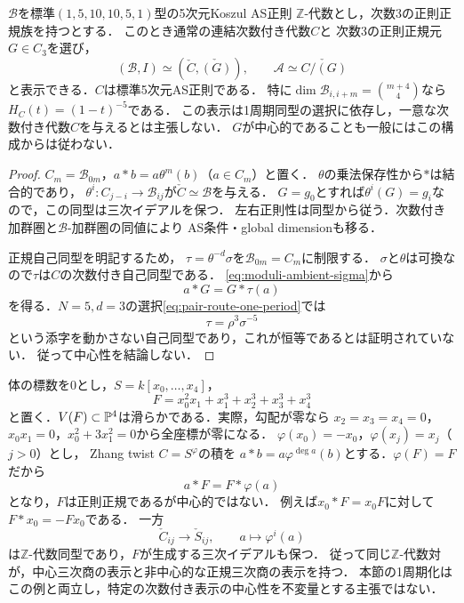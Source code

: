 \begin{corollary}[三次三様体対の次数付き表示]
\label{cor:pair-route-graded-quotient}
\label{cor:moduli-cubic-ambient-periodic}
$\mathcal B$を標準$(1,5,10,10,5,1)$型の5次元Koszul AS正則
$\mathbb Z$-代数とし，次数3の正則正規族を持つとする．
このとき通常の連結次数付き代数$C$と
次数3の正則正規元$G\in C_3$を選び，
\begin{equation}
 (\mathcal B,I)\simeq(\check C,\check{(G)}),\qquad
 \mathcal A\simeq\check{C/(G)}
\end{equation}
と表示できる．$C$は標準5次元AS正則である．
特に$\dim\mathcal B_{i,i+m}=\binom{m+4}{4}$なら$H_C(t)=(1-t)^{-5}$である．
この表示は1周期同型の選択に依存し，一意な次数付き代数$C$を与えるとは主張しない．
$G$が中心的であることも一般にはこの構成からは従わない．
\end{corollary}
\begin{proof}
$C_m=\mathcal B_{0m}$，$a*b=a\theta^m(b)$（$a\in C_m$）と置く．
$\theta$の乗法保存性から$*$は結合的であり，
$\theta^i:C_{j-i}\to\mathcal B_{ij}$が$\check C\simeq\mathcal B$を与える．
$G=g_0$とすれば$\theta^i(G)=g_i$なので，この同型は三次イデアルを保つ．
左右正則性は同型から従う．次数付き加群圏と$\mathcal B$-加群圏の同値により
AS条件・global dimensionも移る．

正規自己同型を明記するため，
$\tau=\theta^{-d}\sigma$を$\mathcal B_{0m}=C_m$に制限する．
$\sigma$と$\theta$は可換なので$\tau$は$C$の次数付き自己同型である．
\eqref{eq:moduli-ambient-sigma}から
\begin{equation}\label{eq:pair-route-normal-tau}
 a*G=G*\tau(a)
\end{equation}
を得る．$N=5,d=3$の選択\eqref{eq:pair-route-one-period}では
\begin{equation}
 \tau=\rho^3\sigma^{-5}
\end{equation}
という添字を動かさない自己同型であり，これが恒等であるとは証明されていない．
従って中心性を結論しない．
\end{proof}

\begin{remark}
\label{ex:pair-route-zhang}
体の標数を$0$とし，$S=k[x_0,\ldots,x_4]$，
\begin{equation}
 F=x_0^2x_1+x_1^3+x_2^3+x_3^3+x_4^3
\end{equation}
と置く．$V(F)\subset\mathbb P^4$は滑らかである．実際，勾配が零なら
$x_2=x_3=x_4=0$，$x_0x_1=0$，$x_0^2+3x_1^2=0$から全座標が零になる．
$\varphi(x_0)=-x_0$，$\varphi(x_j)=x_j$（$j>0$）とし，
Zhang twist $C=S^\varphi$の積を
$a*b=a\varphi^{\deg a}(b)$とする．$\varphi(F)=F$だから
\begin{equation}
 a*F=F*\varphi(a)
\end{equation}
となり，$F$は正則正規であるが中心的ではない．
例えば$x_0*F=x_0F$に対して$F*x_0=-Fx_0$である．
一方
\begin{equation}
 \check C_{ij}\longrightarrow\check S_{ij},\qquad
 a\longmapsto\varphi^i(a)
\end{equation}
は$\mathbb Z$-代数同型であり，$F$が生成する三次イデアルも保つ．
従って同じ$\mathbb Z$-代数対が，中心三次商の表示と非中心的な正規三次商の表示を持つ．
本節の1周期化はこの例と両立し，特定の次数付き表示の中心性を不変量とする主張ではない．
\end{remark}

